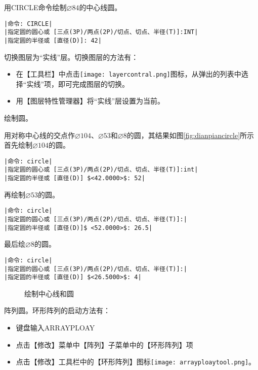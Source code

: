 \begin{procedure}
用CIRCLE命令绘制$\diameter 84$的中心线圆。
\begin{lstlisting}
|命令: CIRCLE|
|指定圆的圆心或 [三点(3P)/两点(2P)/切点、切点、半径(T)]:INT|
|指定圆的半径或 [直径(D)]: 42|
\end{lstlisting}
\item 切换图层为“实线”层。切换图层的方法有：
\begin{itemize}
\item 在【工具栏】中点击\texttt{[image: layercontral.png]}图标，从弹出的列表中选择“实线”项，即可完成图层的切换。
\item 用【图层特性管理器】将“实线”层设置为当前。
\end{itemize}
\item 绘制圆。

用对称中心线的交点作$\diameter 104$、$\diameter 53$和$\diameter 8$的圆，其结果如图\ref{fig:dianpiancircle}所示
首先绘制$\diameter 104$的圆。
\begin{lstlisting}
|命令: circle|
|指定圆的圆心或 [三点(3P)/两点(2P)/切点、切点、半径(T)]:int|
|指定圆的半径或 [直径(D)] $<42.0000>$: 52|
\end{lstlisting}
再绘制$\diameter 53$的圆。
\begin{lstlisting}
|命令: circle|
|指定圆的圆心或 [三点(3P)/两点(2P)/切点、切点、半径(T)]:|
|指定圆的半径或 [直径(D)]$ <52.0000>$: 26.5|
\end{lstlisting}
最后绘$\diameter 8$的圆。
\begin{lstlisting}
|命令: circle|
|指定圆的圆心或 [三点(3P)/两点(2P)/切点、切点、半径(T)]:|
|指定圆的半径或 [直径(D)] $<26.5000>$: 4|
\end{lstlisting}

\begin{figure}[htbp]
\centering
{}\hspace{20pt}
\caption{绘制中心线和圆}
\end{figure}
\item 阵列圆。环形阵列的启动方法有：
\begin{itemize}
\item 键盘输入ARRAYPLOAY
\item 点击【修改】菜单中【阵列】子菜单中的【环形阵列】项
\item 点击【修改】工具栏中的【环形阵列】图标\texttt{[image: arrayploaytool.png]}。
\end{itemize}


\end{procedure}
